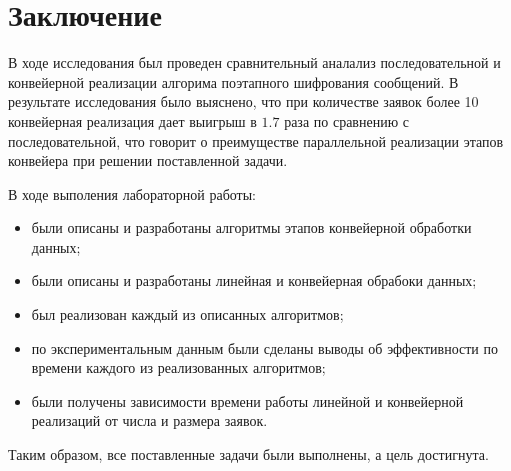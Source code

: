 \chapter*{Заключение}

В ходе исследования был проведен сравнительный аналализ последовательной и
конвейерной реализации алгорима поэтапного шифрования сообщений. В результате
исследования было выяснено, что при количестве заявок более 10 конвейерная
реализация дает выигрыш в $1.7$ раза по сравнению с последовательной, что 
говорит о преимуществе параллельной реализации этапов конвейера при решении
поставленной задачи.

В ходе выполения лабораторной работы:
\begin{itemize}[left=\parindent]
    \item были описаны и разработаны алгоритмы этапов конвейерной обработки
        данных;
    \item были описаны и разработаны линейная и конвейерная обрабоки данных;
    \item был реализован каждый из описанных алгоритмов;
    \item по экспериментальным данным были сделаны выводы об эффективности по
          времени каждого из реализованных алгоритмов;
    \item были получены зависимости времени работы линейной и конвейерной
        реализаций от числа и размера заявок.
\end{itemize}

Таким образом, все поставленные задачи были выполнены, а цель достигнута.
